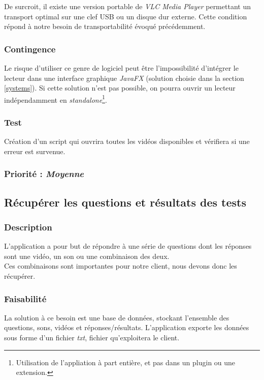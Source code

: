 De surcroit, il existe une version portable de \textit{VLC Media Player} permettant un transport optimal sur une clef USB ou un disque dur externe. Cette condition répond à notre besoin de transportabilité évoqué précédemment.

\subsubsection{Contingence}

Le risque d’utiliser ce genre de logiciel peut être l'impossibilité d'intégrer le lecteur dans une interface graphique \textit{JavaFX} (solution choisie dans la section \ref{systems}). Si cette solution n’est pas possible, on pourra ouvrir un lecteur indépendamment en \textit{standalone}\footnote{Utilisation de l'appliation à part entière, et pas dans un plugin ou une extension.}.

\subsubsection{Test}

Création d’un script qui ouvrira toutes les vidéos disponibles et vérifiera si une erreur est survenue.

\subsubsection{Priorité : \textit{Moyenne}}

\subsection{Récupérer les questions et résultats des tests}

\subsubsection{Description}

L’application a pour but de répondre à une série de questions dont les réponses sont une vidéo, un son ou une combinaison des deux.\\
Ces combinaisons sont importantes pour notre client, nous devons donc les récupérer.

\subsubsection{Faisabilité}

La solution à ce besoin est une base de données, stockant l’ensemble des questions, sons, vidéos et réponses/résultats.
L’application exporte les données sous forme d’un fichier \textit{txt}, fichier qu’exploitera le client.   

